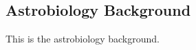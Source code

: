 \subsection{Astrobiology Background}
\label{sec:Astrobiology-Background}

This is the astrobiology background.

